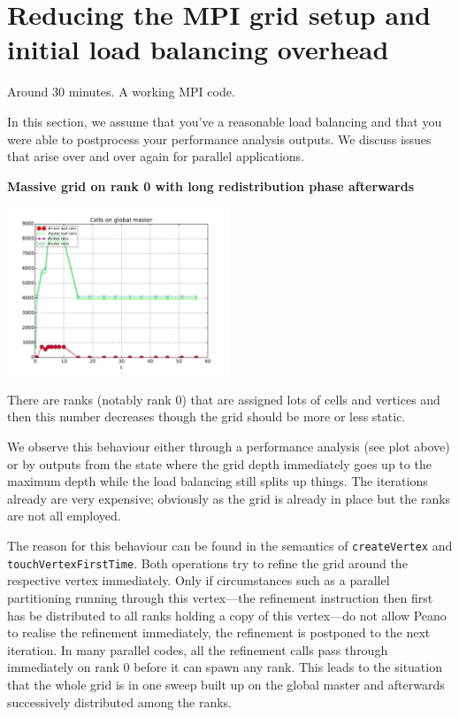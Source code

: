 \section{Reducing the MPI grid setup and initial load balancing overhead}


\chapterDescription
  {
    Around 30 minutes.
  }
  {
    A working MPI code.
  }


In this section, we assume that you've a reasonable load balancing and that you
were able to postprocess your performance analysis outputs. We discuss issues
that arise over and over again for parallel applications.


\vspace{0.6cm}
{\bf \large Massive grid on rank 0 with long redistribution phase
afterwards}

\begin{center}
  \includegraphics[width=0.5\textwidth]{61_mpi-setup/performance-analysis-output.pdf}
\end{center}


\begin{smell}
There are ranks (notably rank 0) that are assigned lots of cells and vertices
and then this number decreases though the grid should be more or less static.
\end{smell}

\noindent
We observe this behaviour either through a performance analysis (see plot above)
or by outputs from the state where the grid depth immediately goes up to the
maximum depth while the load balancing still splits up things. 
The iterations already are very expensive; obviously as the grid is already in
place but the ranks are not all employed.


The reason for this behaviour can be found in the semantics of
\texttt{createVertex} and \linebreak
\texttt{touchVertexFirstTime}.
Both operations try to refine the grid around the respective vertex immediately. 
Only if circumstances such as a parallel partitioning running through this
vertex---the refinement instruction then first has be distributed to all ranks
holding a copy of this vertex---do not allow Peano to realise the refinement
immediately, the refinement is postponed to the next iteration.
In many parallel codes, all the refinement calls pass through immediately on
rank 0 before it can spawn any rank.
This leads to the situation that the whole grid is in one sweep built up on the
global master and afterwards successively distributed among the ranks.


